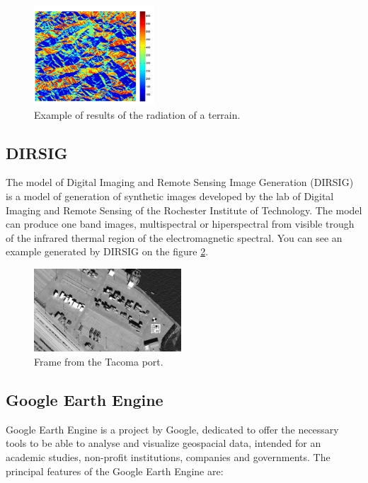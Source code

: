 \documentclass[10pt,a4paper,twocolumn,twoside]{article}
\begin{document}
\begin{figure}[!h]
\centering
  	\includegraphics[width=0.4\textwidth]{lessradiacio}
	\caption{Example of results of the radiation of a terrain.}
	\label{fig-lessradiacio}
\end{figure}

\subsection{DIRSIG}
The model of Digital Imaging and Remote Sensing Image Generation (DIRSIG) is a model of generation of synthetic images developed by the lab of Digital Imaging and Remote Sensing of the Rochester Institute of Technology. The model can produce one band images, multispectral or hiperspectral from visible trough of the infrared thermal region of the electromagnetic spectral. You can see an example generated by DIRSIG on the figure \ref{fig-tacoma}.

\begin{figure}[!h]
\centering
  	\includegraphics[width=0.49\textwidth]{tacoma}
	\caption{Frame from the Tacoma port.}
	\label{fig-tacoma}
\end{figure}

\subsection{Google Earth Engine}

Google Earth Engine is a project by Google, dedicated to offer the necessary tools to be able to analyse and visualize geospacial data, intended for an academic studies, non-profit institutions, companies and governments. The principal features of the Google Earth Engine are:
\end{document}
